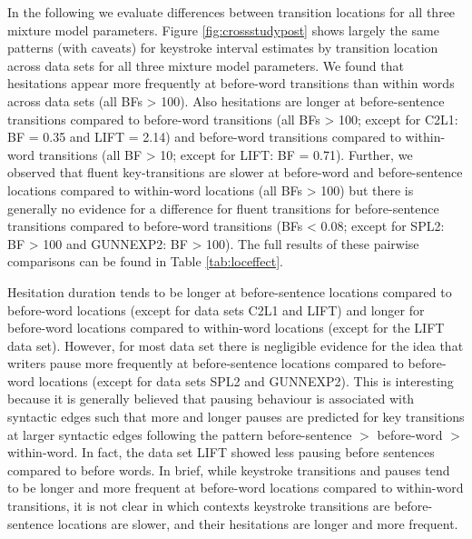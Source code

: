 \documentclass[
  man,floatsintext]{apa7}
\begin{document}
In the following we evaluate differences between transition locations for all three mixture model parameters. Figure \ref{fig:crossstudypost} shows largely the same patterns (with caveats) for keystroke interval estimates by transition location across data sets for all three mixture model parameters. We found that hesitations appear more frequently at before-word transitions than within words across data sets (all BFs \textgreater{} 100). Also hesitations are longer at before-sentence transitions compared to before-word transitions (all BFs \textgreater{} 100; except for C2L1: BF = 0.35 and LIFT = 2.14) and before-word transitions compared to within-word transitions (all BF \textgreater{} 10; except for LIFT: BF = 0.71). Further, we observed that fluent key-transitions are slower at before-word and before-sentence locations compared to within-word locations (all BFs \textgreater{} 100) but there is generally no evidence for a difference for fluent transitions for before-sentence transitions compared to before-word transitions (BFs \textless{} 0.08; except for SPL2: BF \textgreater{} 100 and GUNNEXP2: BF \textgreater{} 100). The full results of these pairwise comparisons can be found in Table \ref{tab:loceffect}.

Hesitation duration tends to be longer at before-sentence locations compared to before-word locations (except for data sets C2L1 and LIFT) and longer for before-word locations compared to within-word locations (except for the LIFT data set). However, for most data set there is negligible evidence for the idea that writers pause more frequently at before-sentence locations compared to before-word locations (except for data sets SPL2 and GUNNEXP2). This is interesting because it is generally believed that pausing behaviour is associated with syntactic edges such that more and longer pauses are predicted for key transitions at larger syntactic edges following the pattern before-sentence \(>\) before-word \(>\) within-word. In fact, the data set LIFT showed less pausing before sentences compared to before words. In brief, while keystroke transitions and pauses tend to be longer and more frequent at before-word locations compared to within-word transitions, it is not clear in which contexts keystroke transitions are before-sentence locations are slower, and their hesitations are longer and more frequent.
\end{document}
